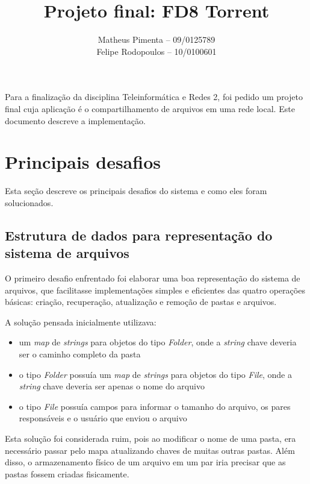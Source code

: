 \documentclass{article}
\title{Projeto final: FD8 Torrent}
\author{Matheus Pimenta -- 09/0125789 \\ Felipe Rodopoulos -- 10/0100601}
\affil{Universidade de Brasília \\ Instituto de Ciências Exatas \\ Departamento de Ciência da Computação \\ Disciplina: Teleinformática e Redes 2}
\begin{document}
\maketitle

Para a finalização da disciplina Teleinformática e Redes 2, foi pedido um projeto final cuja aplicação é o compartilhamento de arquivos em uma rede local. Este documento descreve a implementação.

\section{Principais desafios}

\indent

Esta seção descreve os principais desafios do sistema e como eles foram solucionados.

\subsection{Estrutura de dados para representação do sistema de arquivos}

\indent

O primeiro desafio enfrentado foi elaborar uma boa representação do sistema de arquivos, que facilitasse implementações simples e eficientes das quatro operações básicas: criação, recuperação, atualização e remoção de pastas e arquivos.

A solução pensada inicialmente utilizava:
\begin{itemize}
	\item um \textit{map} de \textit{strings} para objetos do tipo \textit{Folder}, onde a \textit{string} chave deveria ser o caminho completo da pasta
	\item o tipo \textit{Folder} possuía um \textit{map} de \textit{strings} para objetos do tipo \textit{File}, onde a \textit{string} chave deveria ser apenas o nome do arquivo
	\item o tipo \textit{File} possuía campos para informar o tamanho do arquivo, os pares responsáveis e o usuário que enviou o arquivo
\end{itemize}

Esta solução foi considerada ruim, pois ao modificar o nome de uma pasta, era necessário passar pelo mapa atualizando chaves de muitas outras pastas. Além disso, o armazenamento físico de um arquivo em um par iria precisar que as pastas fossem criadas fisicamente.
\end{document}

